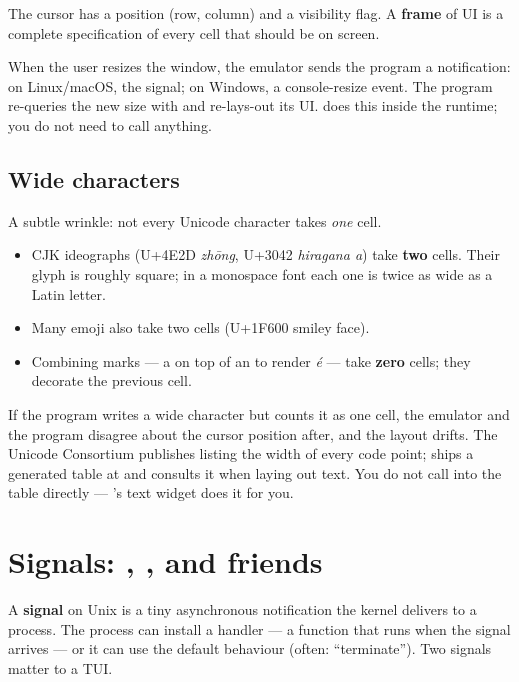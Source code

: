 The cursor has a position (row, column) and a visibility flag. A
\textbf{frame} of UI is a complete specification of every cell that
should be on screen.

When the user resizes the window, the emulator sends the program a
notification: on Linux/macOS, the  signal; on Windows,
a console-resize event. The program re-queries the new size with
 and re-lays-out its UI. \maya{} does this
inside the runtime; you do not need to call anything.

\subsection{Wide characters}

A subtle wrinkle: not every Unicode character takes \emph{one} cell.

\begin{itemize}[leftmargin=*]
  \item CJK ideographs (U+4E2D \emph{zh\=ong}, U+3042 \emph{hiragana
    a}) take \textbf{two} cells. Their glyph is roughly square; in a
    monospace font each one is twice as wide as a Latin letter.
  \item Many emoji also take two cells (U+1F600 smiley face).
  \item Combining marks --- a  on top
    of an  to render \emph{\'e} --- take \textbf{zero}
    cells; they decorate the previous cell.
\end{itemize}

If the program writes a wide character but counts it as one cell, the
emulator and the program disagree about the cursor position after,
and the layout drifts. The Unicode Consortium publishes
 listing the width of every code point;
\maya{} ships a generated table at
 and consults it
when laying out text. You do not call into the table directly ---
\maya{}'s text widget does it for you.

\section{Signals: , , and friends}
\label{sec:term:signals}

A \textbf{signal} on Unix is a tiny asynchronous notification the
kernel delivers to a process. The process can install a handler ---
a function that runs when the signal arrives --- or it can use the
default behaviour (often: ``terminate''). Two signals matter to a
TUI.

